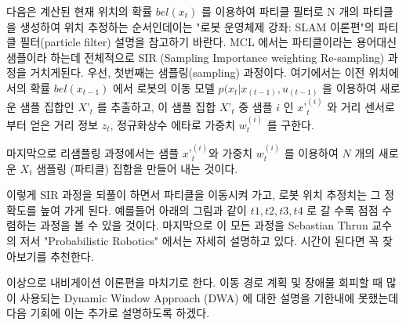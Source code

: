 다음은 계산된 현재 위치의 확률 $bel(x_t)$ 를 이용하여 파티클 필터로 N 개의 파티클을 생성하여 위치 추정하는 순서인데이는 "로봇 운영체제 강좌: SLAM 이론편"의 파티클 필터(particle filter) 설명을 참고하기 바란다. MCL 에서는 파티클이라는 용어대신 샘플이라 하는데 전체적으로 SIR (Sampling Importance weighting Re-sampling) 과정을 거치게된다. 우선, 첫번째는 샘플링(sampling) 과정이다. 여기에서는 이전 위치에서의 확률 $bel(x_{t-1})$ 에서 로봇의 이동 모델 $p( x_t | x_{(t-1)}, u_{(t-1)}$ 을 이용하여 새로운 샘플 집합인 ${X’}_t$  를 추출하고, 이 샘플 집합 $X{’}_t$ 중 샘플 $i$ 인 ${x’}_t^{(i)}$ 와 거리 센서로 부터 얻은 거리 정보 $z_t$, 정규화상수 에타로 가중치 $w_t^{(i)}$ 를 구한다. 


마지막으로 리샘플링 과정에서는 샘플 ${x’}_t^{(i)}$와 가중치 $w_t^{(i)}$ 를 이용하여 $N$ 개의 새로운 $X_t$ 샘플링 (파티클) 집합을 만들어 내는 것이다. 



이렇게 SIR 과정을 되풀이 하면서 파티클을 이동시켜 가고, 로봇 위치 추정치는 그 정확도를 높여 가게 된다. 예를들어 아래의 그림과 같이 $t1, t2, t3, t4$ 로 갈 수록 점점 수렴하는 과정을 볼 수 있을 것이다. 마지막으로 이 모든 과정을 Sebastian Thrun 교수의 저서 "Probabilistic Robotics"  에서는 자세히 설명하고 있다. 시간이 된다면 꼭 찾아보기를 추천한다. 


이상으로 내비게이션 이론편을 마치기로 한다. 이동 경로 계획 및 장애물 회피할 때 많이 사용되는 Dynamic Window Approach (DWA) 에 대한 설명을 기한내에 못했는데 다음 기회에 이는 추가로 설명하도록 하겠다.



